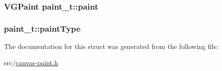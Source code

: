 \subsubsection[{paint}]{\setlength{\rightskip}{0pt plus 5cm}V\+G\+Paint paint\+\_\+t\+::paint}\label{structpaint__t_a4e1356c7f535abd01d52e5f0a080a2fd}
\hypertarget{structpaint__t_a1847b9704a2a157bd821f0c81a58a39d}{}
\subsubsection[{paint\+Type}]{ paint\+\_\+t\+::paint\+Type}\label{structpaint__t_a1847b9704a2a157bd821f0c81a58a39d}


The documentation for this struct was generated from the following file\+:\begin{DoxyCompactItemize}
\item 
src/\hyperlink{canvas-paint_8h}{canvas-\/paint.\+h}\end{DoxyCompactItemize}
